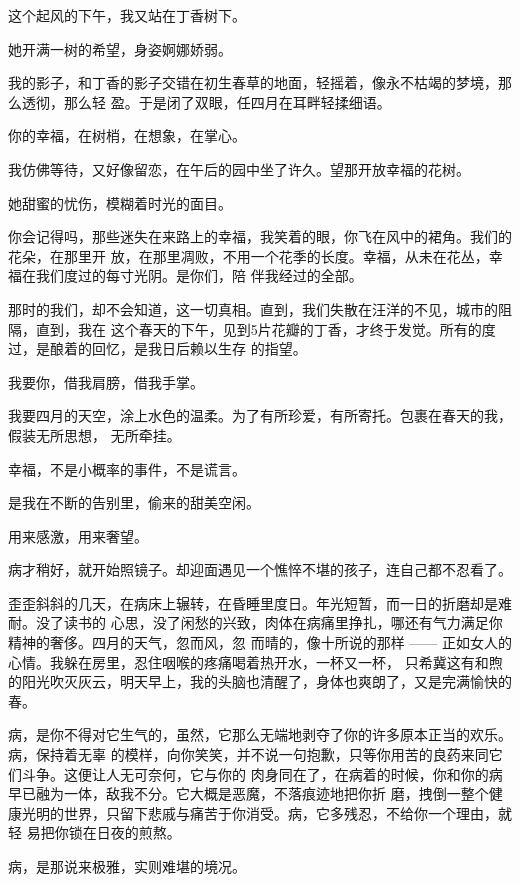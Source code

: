		这个起风的下午，我又站在丁香树下。

		她开满一树的希望，身姿婀娜娇弱。

		我的影子，和丁香的影子交错在初生春草的地面，轻摇着，像永不枯竭的梦境，那么透彻，那么轻
	盈。于是闭了双眼，任四月在耳畔轻揉细语。

		你的幸福，在树梢，在想象，在掌心。


		我仿佛等待，又好像留恋，在午后的园中坐了许久。望那开放幸福的花树。

		她甜蜜的忧伤，模糊着时光的面目。

		你会记得吗，那些迷失在来路上的幸福，我笑着的眼，你飞在风中的裙角。我们的花朵，在那里开
	放，在那里凋败，不用一个花季的长度。幸福，从未在花丛，幸福在我们度过的每寸光阴。是你们，陪
	伴我经过的全部。


		那时的我们，却不会知道，这一切真相。直到，我们失散在汪洋的不见，城市的阻隔，直到，我在
	这个春天的下午，见到5片花瓣的丁香，才终于发觉。所有的度过，是酿着的回忆，是我日后赖以生存
	的指望。


		我要你，借我肩膀，借我手掌。

		我要四月的天空，涂上水色的温柔。为了有所珍爱，有所寄托。包裹在春天的我，假装无所思想，
	无所牵挂。

		幸福，不是小概率的事件，不是谎言。

		是我在不断的告别里，偷来的甜美空闲。

		用来感激，用来奢望。

	\endwriting



		病才稍好，就开始照镜子。却迎面遇见一个憔悴不堪的孩子，连自己都不忍看了。

		歪歪斜斜的几天，在病床上辗转，在昏睡里度日。年光短暂，而一日的折磨却是难耐。没了读书的
	心思，没了闲愁的兴致，肉体在病痛里挣扎，哪还有气力满足你精神的奢侈。四月的天气，忽而风，忽
	而晴的，像十所说的那样 —— 正如女人的心情。我躲在房里，忍住咽喉的疼痛喝着热开水，一杯又一杯，
	只希冀这有和煦的阳光吹灭灰云，明天早上，我的头脑也清醒了，身体也爽朗了，又是完满愉快的春。

		病，是你不得对它生气的，虽然，它那么无端地剥夺了你的许多原本正当的欢乐。病，保持着无辜
	的模样，向你笑笑，并不说一句抱歉，只等你用苦的良药来同它们斗争。这便让人无可奈何，它与你的
	肉身同在了，在病着的时候，你和你的病早已融为一体，敌我不分。它大概是恶魔，不落痕迹地把你折
	磨，拽倒一整个健康光明的世界，只留下悲戚与痛苦于你消受。病，它多残忍，不给你一个理由，就轻
	易把你锁在日夜的煎熬。

		病，是那说来极雅，实则难堪的境况。

